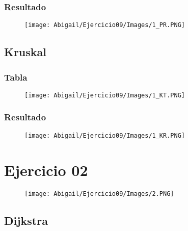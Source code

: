 \documentclass[12pt]{article}
\begin{document}
      \subsubsection{Resultado}
        \begin{figure}[h!]
          \centering
          \texttt{[image: Abigail/Ejercicio09/Images/1\_PR.PNG]}
        \end{figure} 

    \subsection{Kruskal}

      \subsubsection{Tabla}

        \begin{figure}[h!]
          \centering
          \texttt{[image: Abigail/Ejercicio09/Images/1\_KT.PNG]}
        \end{figure} 

      \subsubsection{Resultado}

        \begin{figure}[h!]
          \centering
          \texttt{[image: Abigail/Ejercicio09/Images/1\_KR.PNG]}
        \end{figure} 


  
  \section{Ejercicio 02}

    \begin{figure}[h!]
      \centering
      \texttt{[image: Abigail/Ejercicio09/Images/2.PNG]}
    \end{figure} 

    \subsection{Dijkstra}
\end{document}

